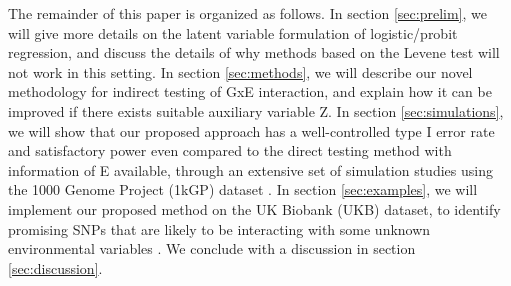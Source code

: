The remainder of this paper is organized as follows. In section \ref{sec:prelim}, we will give more details on the latent variable formulation of logistic/probit regression, and discuss the details of why methods based on the Levene test will not work in this setting. In section \ref{sec:methods}, we will describe our novel methodology for indirect testing of GxE interaction, and explain how it can be improved if there exists suitable auxiliary variable Z. In section \ref{sec:simulations}, we will show that our proposed approach has a well-controlled type I error rate and satisfactory power even compared to the direct testing method with information of E available, through an extensive set of simulation studies using the 1000 Genome Project (1kGP) dataset \citep{1KGP}. In section \ref{sec:examples}, we will implement our proposed method on the UK Biobank (UKB) dataset, to identify promising SNPs that are likely to be interacting with some unknown environmental variables \citep{UKB}. We conclude with a discussion in section \ref{sec:discussion}.




